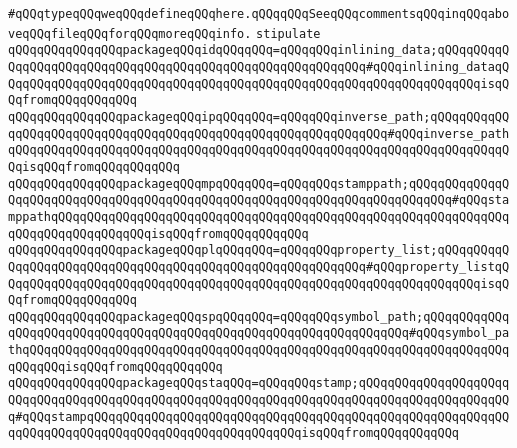 \verb|#qQQqtypeqQQqweqQQqdefineqQQqhere.qQQqqQQqSeeqQQqcommentsqQQqinqQQqaboveqQQqfileqQQqforqQQqmoreqQQqinfo.|\newline
\newline
\newline
\newline
\verb|stipulate|\newline
\verb|qQQqqQQqqQQqqQQqpackageqQQqidqQQqqQQq=qQQqqQQqinlining_data;qQQqqQQqqQQqqQQqqQQqqQQqqQQqqQQqqQQqqQQqqQQqqQQqqQQqqQQqqQQq#qQQqinlining_dataqQQqqQQqqQQqqQQqqQQqqQQqqQQqqQQqqQQqqQQqqQQqqQQqqQQqqQQqqQQqqQQqqQQqisqQQqfromqQQqqQQqqQQq|\newline
\verb|qQQqqQQqqQQqqQQqpackageqQQqipqQQqqQQq=qQQqqQQqinverse_path;qQQqqQQqqQQqqQQqqQQqqQQqqQQqqQQqqQQqqQQqqQQqqQQqqQQqqQQqqQQqqQQq#qQQqinverse_pathqQQqqQQqqQQqqQQqqQQqqQQqqQQqqQQqqQQqqQQqqQQqqQQqqQQqqQQqqQQqqQQqqQQqqQQqisqQQqfromqQQqqQQqqQQq|\newline
\verb|qQQqqQQqqQQqqQQqpackageqQQqmpqQQqqQQq=qQQqqQQqstamppath;qQQqqQQqqQQqqQQqqQQqqQQqqQQqqQQqqQQqqQQqqQQqqQQqqQQqqQQqqQQqqQQqqQQqqQQqqQQq#qQQqstamppathqQQqqQQqqQQqqQQqqQQqqQQqqQQqqQQqqQQqqQQqqQQqqQQqqQQqqQQqqQQqqQQqqQQqqQQqqQQqqQQqqQQqisqQQqfromqQQqqQQqqQQq|\newline
\verb|qQQqqQQqqQQqqQQqpackageqQQqplqQQqqQQq=qQQqqQQqproperty_list;qQQqqQQqqQQqqQQqqQQqqQQqqQQqqQQqqQQqqQQqqQQqqQQqqQQqqQQqqQQq#qQQqproperty_listqQQqqQQqqQQqqQQqqQQqqQQqqQQqqQQqqQQqqQQqqQQqqQQqqQQqqQQqqQQqqQQqqQQqisqQQqfromqQQqqQQqqQQq|\newline
\verb|qQQqqQQqqQQqqQQqpackageqQQqspqQQqqQQq=qQQqqQQqsymbol_path;qQQqqQQqqQQqqQQqqQQqqQQqqQQqqQQqqQQqqQQqqQQqqQQqqQQqqQQqqQQqqQQqqQQq#qQQqsymbol_pathqQQqqQQqqQQqqQQqqQQqqQQqqQQqqQQqqQQqqQQqqQQqqQQqqQQqqQQqqQQqqQQqqQQqqQQqqQQqisqQQqfromqQQqqQQqqQQq|\newline
\verb|qQQqqQQqqQQqqQQqpackageqQQqstaqQQq=qQQqqQQqstamp;qQQqqQQqqQQqqQQqqQQqqQQqqQQqqQQqqQQqqQQqqQQqqQQqqQQqqQQqqQQqqQQqqQQqqQQqqQQqqQQqqQQqqQQqqQQq#qQQqstampqQQqqQQqqQQqqQQqqQQqqQQqqQQqqQQqqQQqqQQqqQQqqQQqqQQqqQQqqQQqqQQqqQQqqQQqqQQqqQQqqQQqqQQqqQQqqQQqqQQqisqQQqfromqQQqqQQqqQQq|\newline
